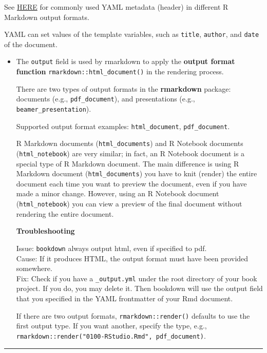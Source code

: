 \documentclass[
  a4paper,
  twoside,
  openright]{book}
\theoremstyle{definition}
\theoremstyle{definition}
\theoremstyle{definition}
\theoremstyle{definition}
\theoremstyle{remark}
\begin{document}
See \href{https://github.com/hao203/rmarkdown-YAML.git}{HERE} for commonly used YAML metadata (header) in different R Markdown output formats.

YAML can set values of the template variables, such as \texttt{title}, \texttt{author}, and \texttt{date} of the document.

\begin{itemize}
\item
  The \texttt{output} field is used by rmarkdown to apply the {\textbf{output format function}} \texttt{rmarkdown::html\_document()} in the rendering process.

  There are two types of output formats in the \textbf{rmarkdown} package: documents (e.g., \texttt{pdf\_document}), and presentations (e.g., \texttt{beamer\_presentation}).

  Supported output format examples: \texttt{html\_document}, \texttt{pdf\_document}.

  R Markdown documents (\texttt{html\_documents}) and R Notebook documents (\texttt{html\_notebook}) are very similar; in fact, an R Notebook document is a special type of R Markdown document. The main difference is using R Markdown document (\texttt{html\_documents}) you have to knit (render) the entire document each time you want to preview the document, even if you have made a minor change. However, using an R Notebook document (\texttt{html\_notebook}) you can view a preview of the final document without rendering the entire document.

  \textbf{Troubleshooting}

  Issue: \texttt{bookdown} always output html, even if specified to pdf.\\
  Cause: If it produces HTML, the output format must have been provided somewhere.\\
  Fix: Check if you have a \texttt{\_output.yml} under the root directory of your book project. If you do, you may delete it. Then bookdown will use the output field that you specified in the YAML frontmatter of your Rmd document.

  If there are two output formats, \texttt{rmarkdown::render()} defaults to use the first output type. If you want another, specify the type, e.g., \texttt{rmarkdown::render("0100-RStudio.Rmd",\ \textquotesingle{}pdf\_document\textquotesingle{})}.
\end{itemize}

\begin{center}\rule{0.5\linewidth}{0.5pt}\end{center}
\end{document}

